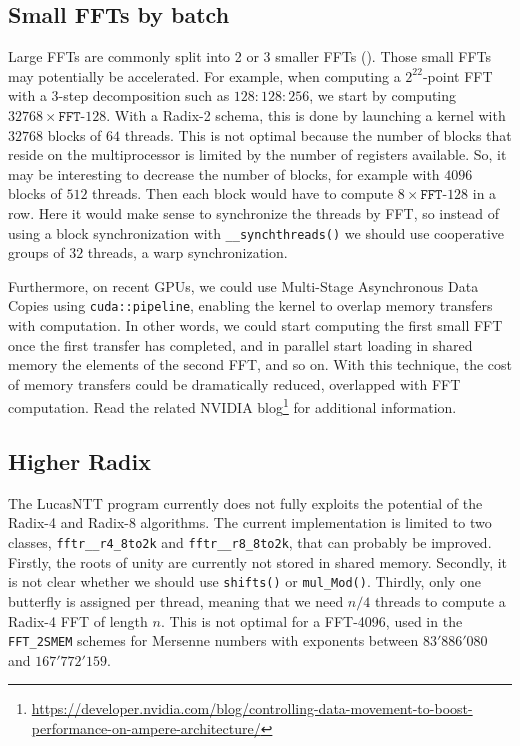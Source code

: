 \documentclass{article}
\begin{document}
\subsection{Small FFTs by batch}
Large FFTs are commonly split into 2 or 3 smaller FFTs (\cite{Bai89}). Those small FFTs may potentially be accelerated. For example, when computing a $2^{22}$-point FFT with a 3-step decomposition such as $128:128:256$, we start by computing $32768 \times \texttt{FFT-}128$. With a Radix-2 schema, this is done by launching a kernel with $32768$ blocks of $64$ threads. This is not optimal because the number of blocks that reside on the multiprocessor is limited by the number of registers available. So, it may be interesting to decrease the number of blocks, for example with $4096$ blocks of $512$ threads. Then each block would have to compute $8 \times \texttt{FFT-}128$ in a row. Here it would make sense to synchronize the threads by FFT, so instead of using a block synchronization with \texttt{\_\_synchthreads()} we should use cooperative groups of $32$ threads, a warp synchronization.

Furthermore, on recent GPUs, we could use Multi-Stage Asynchronous Data Copies using \texttt{cuda::pipeline}, enabling the kernel to overlap memory transfers with computation. In other words, we could start computing the first small FFT once the first transfer has completed, and in parallel start loading in shared memory the elements of the second FFT, and so on. With this technique, the cost of memory transfers could be dramatically reduced, overlapped with FFT computation. Read the related NVIDIA blog\footnote{\url{https://developer.nvidia.com/blog/controlling-data-movement-to-boost-performance-on-ampere-architecture/}} for additional information.

\subsection{Higher Radix}
The LucasNTT program currently does not fully exploits the potential of the Radix-4 and Radix-8 algorithms. The current implementation is limited to two classes, \texttt{fftr\_\_r4\_8to2k} and \texttt{fftr\_\_r8\_8to2k}, that can probably be improved. Firstly, the roots of unity are currently not stored in shared memory. Secondly, it is not clear whether we should use \texttt{shifts()} or \texttt{mul\_Mod()}. Thirdly, only one butterfly is assigned per thread, meaning that we need $n/4$ threads to compute a Radix-4 FFT of length $n$. This is not optimal for a FFT-4096, used in the \texttt{FFT\_2SMEM} schemes for Mersenne numbers with exponents between $83'886'080$ and $167'772'159$.
\end{document}
